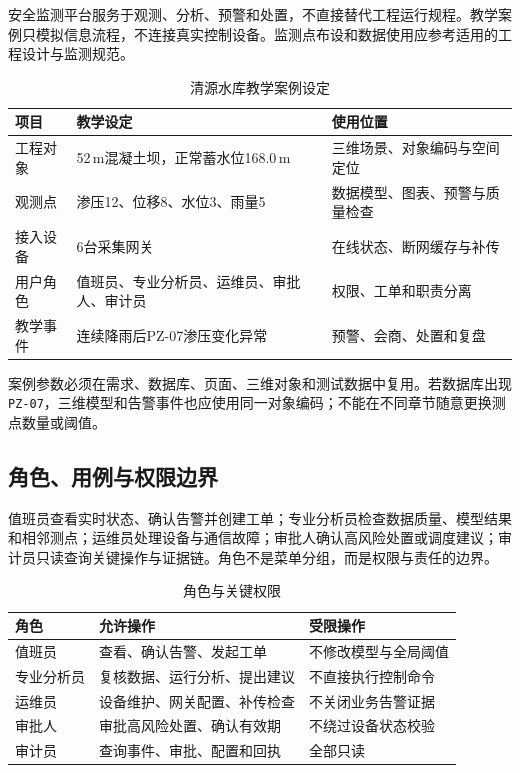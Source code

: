 安全监测平台服务于观测、分析、预警和处置，不直接替代工程运行规程。教学案例只模拟信息流程，不连接真实控制设备。监测点布设和数据使用应参考适用的工程设计与监测规范\cite{sl6012013,slt7252016}。

\begin{table}[htbp]
\centering
\caption{清源水库教学案例设定}
\label{tab:case-parameters}
\begin{tabular}{p{2.8cm}p{3.5cm}p{6.0cm}}
\toprule
项目 & 教学设定 & 使用位置 \\
\midrule
工程对象 & 52\,m混凝土坝，正常蓄水位168.0\,m & 三维场景、对象编码与空间定位 \\
观测点 & 渗压12、位移8、水位3、雨量5 & 数据模型、图表、预警与质量检查 \\
接入设备 & 6台采集网关 & 在线状态、断网缓存与补传 \\
用户角色 & 值班员、专业分析员、运维员、审批人、审计员 & 权限、工单和职责分离 \\
教学事件 & 连续降雨后PZ-07渗压变化异常 & 预警、会商、处置和复盘 \\
\bottomrule
\end{tabular}
\end{table}

案例参数必须在需求、数据库、页面、三维对象和测试数据中复用。若数据库出现\texttt{PZ-07}，三维模型和告警事件也应使用同一对象编码；不能在不同章节随意更换测点数量或阈值。

\subsection{角色、用例与权限边界}

值班员查看实时状态、确认告警并创建工单；专业分析员检查数据质量、模型结果和相邻测点；运维员处理设备与通信故障；审批人确认高风险处置或调度建议；审计员只读查询关键操作与证据链。角色不是菜单分组，而是权限与责任的边界。

\begin{table}[htbp]
\centering
\caption{角色与关键权限}
\label{tab:case-roles}
\begin{tabular}{p{2.3cm}p{4.8cm}p{5.2cm}}
\toprule
角色 & 允许操作 & 受限操作 \\
\midrule
值班员 & 查看、确认告警、发起工单 & 不修改模型与全局阈值 \\
专业分析员 & 复核数据、运行分析、提出建议 & 不直接执行控制命令 \\
运维员 & 设备维护、网关配置、补传检查 & 不关闭业务告警证据 \\
审批人 & 审批高风险处置、确认有效期 & 不绕过设备状态校验 \\
审计员 & 查询事件、审批、配置和回执 & 全部只读 \\
\bottomrule
\end{tabular}
\end{table}


